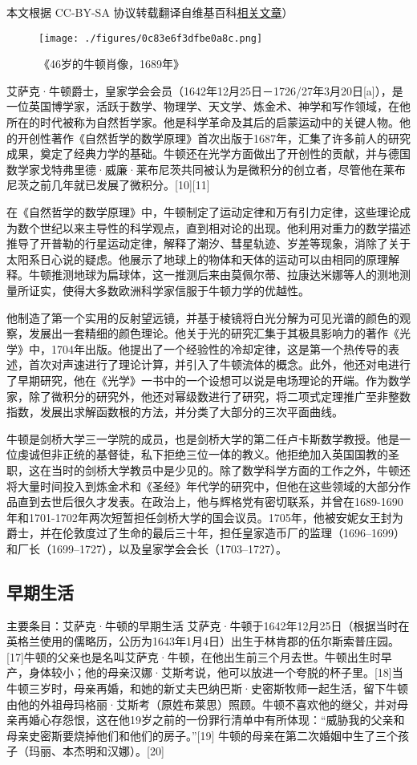
本文根据 CC-BY-SA 协议转载翻译自维基百科\href{https://en.wikipedia.org/wiki/Isaac_Newton}{相关文章}）

\begin{figure}[ht]
\centering
\texttt{[image: ./figures/0c83e6f3dfbe0a8c.png]}
\caption{《46岁的牛顿肖像，1689年》} \label{fig_Newton_1}
\end{figure}
艾萨克·牛顿爵士，皇家学会会员（1642年12月25日－1726/27年3月20日[a]），是一位英国博学家，活跃于数学、物理学、天文学、炼金术、神学和写作领域，在他所在的时代被称为自然哲学家。他是科学革命及其后的启蒙运动中的关键人物。他的开创性著作《自然哲学的数学原理》首次出版于1687年，汇集了许多前人的研究成果，奠定了经典力学的基础。牛顿还在光学方面做出了开创性的贡献，并与德国数学家戈特弗里德·威廉·莱布尼茨共同被认为是微积分的创立者，尽管他在莱布尼茨之前几年就已发展了微积分。[10][11]

在《自然哲学的数学原理》中，牛顿制定了运动定律和万有引力定律，这些理论成为数个世纪以来主导性的科学观点，直到相对论的出现。他利用对重力的数学描述推导了开普勒的行星运动定律，解释了潮汐、彗星轨迹、岁差等现象，消除了关于太阳系日心说的疑虑。他展示了地球上的物体和天体的运动可以由相同的原理解释。牛顿推测地球为扁球体，这一推测后来由莫佩尔蒂、拉康达米娜等人的测地测量所证实，使得大多数欧洲科学家信服于牛顿力学的优越性。

他制造了第一个实用的反射望远镜，并基于棱镜将白光分解为可见光谱的颜色的观察，发展出一套精细的颜色理论。他关于光的研究汇集于其极具影响力的著作《光学》中，1704年出版。他提出了一个经验性的冷却定律，这是第一个热传导的表述，首次对声速进行了理论计算，并引入了牛顿流体的概念。此外，他还对电进行了早期研究，他在《光学》一书中的一个设想可以说是电场理论的开端。作为数学家，除了微积分的研究外，他还对幂级数进行了研究，将二项式定理推广至非整数指数，发展出求解函数根的方法，并分类了大部分的三次平面曲线。

牛顿是剑桥大学三一学院的成员，也是剑桥大学的第二任卢卡斯数学教授。他是一位虔诚但非正统的基督徒，私下拒绝三位一体的教义。他拒绝加入英国国教的圣职，这在当时的剑桥大学教员中是少见的。除了数学科学方面的工作之外，牛顿还将大量时间投入到炼金术和《圣经》年代学的研究中，但他在这些领域的大部分作品直到去世后很久才发表。在政治上，他与辉格党有密切联系，并曾在1689-1690年和1701-1702年两次短暂担任剑桥大学的国会议员。1705年，他被安妮女王封为爵士，并在伦敦度过了生命的最后三十年，担任皇家造币厂的监理（1696–1699）和厂长（1699–1727），以及皇家学会会长（1703–1727）。
\subsection{早期生活}  
主要条目：艾萨克·牛顿的早期生活  
艾萨克·牛顿于1642年12月25日（根据当时在英格兰使用的儒略历，公历为1643年1月4日）出生于林肯郡的伍尔斯索普庄园。[17]牛顿的父亲也是名叫艾萨克·牛顿，在他出生前三个月去世。牛顿出生时早产，身体较小；他的母亲汉娜·艾斯考说，他可以放进一个夸脱的杯子里。[18]当牛顿三岁时，母亲再婚，和她的新丈夫巴纳巴斯·史密斯牧师一起生活，留下牛顿由他的外祖母玛格丽·艾斯考（原姓布莱思）照顾。牛顿不喜欢他的继父，并对母亲再婚心存怨恨，这在他19岁之前的一份罪行清单中有所体现：“威胁我的父亲和母亲史密斯要烧掉他们和他们的房子。”[19] 牛顿的母亲在第二次婚姻中生了三个孩子（玛丽、本杰明和汉娜）。[20]
